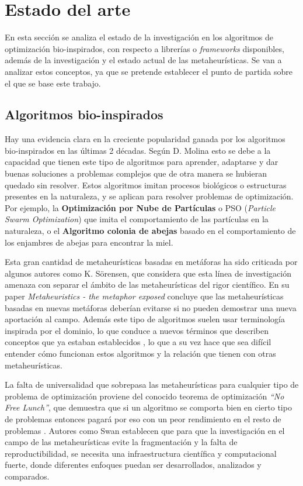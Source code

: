 \chapter{Estado del arte}

En esta sección se analiza el estado de la investigación en los algoritmos de optimización bio-inspirados, con respecto a
librerías o \emph{frameworks} disponibles, además de la investigación y el estado actual de las metaheurísticas. Se van a analizar
estos conceptos, ya que se pretende establecer el punto de partida sobre el que se base este trabajo.

\section{Algoritmos bio-inspirados}

Hay una evidencia clara en la creciente popularidad ganada por los algoritmos bio-inspirados en las últimas 2 décadas. Según D. Molina \cite{Molina2020ComprehensiveTO} esto se
debe a la capacidad que tienen este tipo de algoritmos para aprender, adaptarse y dar buenas soluciones a problemas complejos que de otra manera se hubieran quedado sin
resolver. Estos algoritmos imitan procesos biológicos o estructuras presentes en la naturaleza, y se aplican para resolver problemas de optimización. Por ejemplo, 
la \textbf{Optimización por Nube de Partículas} o PSO (\textit{Particle Swarm Optimization}) que imita el comportamiento de las partículas en la naturaleza, o 
el \textbf{Algoritmo colonia de abejas} basado en el comportamiento de los enjambres de abejas para encontrar la miel. 

Esta gran cantidad de metaheurísticas basadas en metáforas ha sido criticada por algunos autores como K. Sörensen\cite{metaphor_exposed}, 
que considera que esta línea de investigación amenaza con separar el ámbito de las metaheurísticas del rigor científico. 
En su paper \emph{Metaheuristics - the metaphor exposed} concluye que las metaheurísticas basadas en nuevas metáforas deberían 
evitarse si no pueden demostrar una nueva aportación al campo. Además este tipo de algoritmos suelen usar terminología inspirada por el dominio, 
lo que conduce a nuevos términos que describen conceptos que ya estaban establecidos \cite{mitigating_metaphors}, lo que a su vez hace que sea difícil
entender cómo funcionan estos algoritmos y la relación que tienen con otras metaheurísticas.

La falta de universalidad que sobrepasa las metaheurísticas para cualquier tipo de problema de optimización proviene
del conocido teorema de optimización \emph{``No Free Lunch''}, que demuestra que si un algoritmo se comporta bien en cierto tipo de 
problemas entonces pagará por eso con un peor rendimiento en el resto de problemas \cite{585893}. Autores como 
Swan \cite{metaheuristics} establecen que para que la investigación en el campo de las metaheurísticas evite la fragmentación y la falta de reproductibilidad, se 
necesita una infraestructura científica y computacional fuerte, donde diferentes enfoques puedan ser desarrollados, analizados y comparados. 

